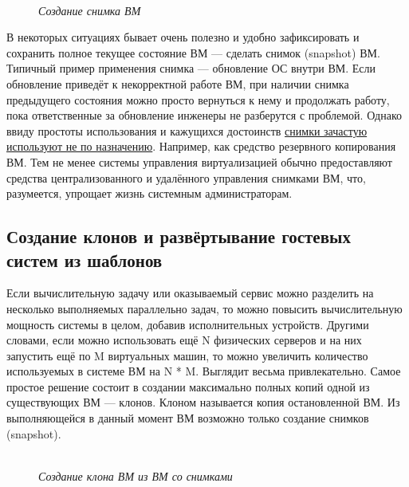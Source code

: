 \documentclass[14pt, a4paper]{article}
\begin{document}
\begin{figure}[h]
    \centering
    \\ 
    \small\textit{Создание снимка ВМ}  
    \label{framework} 
\end{figure}

В некоторых ситуациях бывает очень полезно и удобно зафиксировать и сохранить полное текущее
состояние ВМ — сделать снимок (snapshot) ВМ. Типичный пример применения снимка — обновление
ОС внутри ВМ. Если обновление приведёт к некорректной работе ВМ, при наличии снимка
предыдущего состояния можно просто вернуться к нему и продолжать работу, пока ответственные за
обновление инженеры не разберутся с проблемой. Однако ввиду простоты использования и
кажущихся достоинств \href{https://www.vmgu.ru/news/vmware-vsphere-esx-snapshots-are-bad}{снимки зачастую используют не по назначению}. Например, как средство
резервного копирования ВМ. Тем не менее системы управления виртуализацией обычно
предоставляют средства централизованного и удалённого управления снимками ВМ, что, разумеется,
упрощает жизнь системным администраторам.

\subsection*{Создание клонов и развёртывание гостевых систем из
шаблонов} 

Если вычислительную задачу или оказываемый сервис можно разделить на несколько выполняемых
параллельно задач, то можно повысить вычислительную мощность системы в целом, добавив
исполнительных устройств. Другими словами, если можно использовать ещё N физических серверов
и на них запустить ещё по M виртуальных машин, то можно увеличить количество используемых в
системе ВМ на N * M. Выглядит весьма привлекательно. Самое простое решение состоит в создании
максимально полных копий одной из существующих ВМ — клонов. Клоном называется копия
остановленной ВМ. Из выполняющейся в данный момент ВМ возможно только создание снимков
(snapshot).


\begin{figure}[h]
    \centering
    \\ 
    \small\textit{Создание клона ВМ из ВМ со снимками}  
    \label{framework} 
\end{figure}
\end{document}

